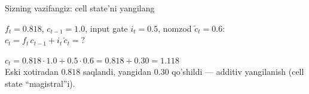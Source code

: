 \documentclass[aspectratio=169,11pt]{beamer}
\begin{document}
\begin{frame}{Sizning vazifangiz: cell state'ni yangilang}
  \begin{tcolorbox}[warnbox,title=Savol --- 90 soniya]
    \small
    $f_t=0.818$, $c_{t-1}=1.0$, input gate $i_t=0.5$, nomzod $\tilde{c}_t=0.6$:\\[4pt]
    \textbf{\large $c_t = f_t\,c_{t-1} + i_t\,\tilde{c}_t = ?$}
  \end{tcolorbox}
  \pause
  \begin{tcolorbox}[okbox,title=Javob]
    \small
    $c_t = 0.818{\cdot}1.0 + 0.5{\cdot}0.6 = 0.818 + 0.30 = \mathbf{1.118}$\\[3pt]
    \footnotesize Eski xotiradan $0.818$ saqlandi, yangidan $0.30$ qo'shildi ---
    additiv yangilanish (cell state ``magistral''i).
  \end{tcolorbox}
\end{frame}
\end{document}
